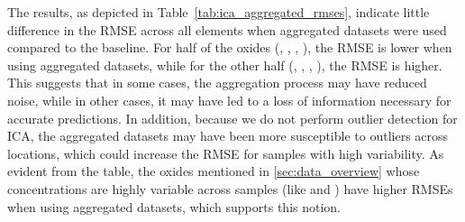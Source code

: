 The results, as depicted in Table~\ref{tab:ica_aggregated_rmses}, indicate little difference in the RMSE across all elements when aggregated datasets were used compared to the baseline.
For half of the oxides (, , , ), the RMSE is lower when using aggregated datasets, while for the other half (, , , ), the RMSE is higher.
This suggests that in some cases, the aggregation process may have reduced noise, while in other cases, it may have led to a loss of information necessary for accurate predictions.
In addition, because we do not perform outlier detection for ICA, the aggregated datasets may have been more susceptible to outliers across locations, which could increase the RMSE for samples with high variability.
As evident from the table, the oxides mentioned in \ref{sec:data_overview} whose concentrations are highly variable across samples (like  and ) have higher RMSEs when using aggregated datasets, which supports this notion.